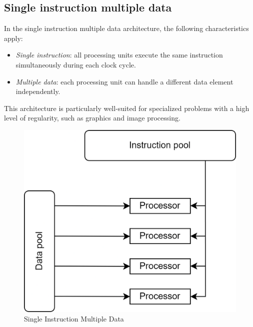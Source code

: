\subsection{Single instruction multiple data}
In the single instruction multiple data architecture, the following characteristics apply:
\begin{itemize}
    \item \textit{Single instruction}: all processing units execute the same instruction simultaneously during each clock cycle.
    \item \textit{Multiple data}: each processing unit can handle a different data element independently.
\end{itemize}
This architecture is particularly well-suited for specialized problems with a high level of regularity, such as graphics and image processing.

\begin{figure}[H]
    \centering
    \includegraphics[width=0.3\linewidth]{images/simd.png}
    \caption{Single Instruction Multiple Data }
\end{figure}

